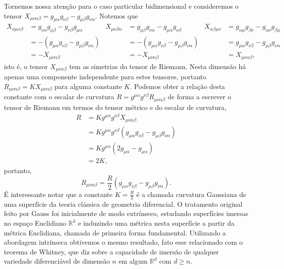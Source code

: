 Tornemos nossa atenção para o caso particular bidimensional e consideremos o tensor \(X_{\mu\nu\alpha\beta} = g_{\mu\alpha} g_{\nu\beta} - g_{\mu\beta}g_{\nu\alpha}\). Notemos que
\begin{align*}
    X_{\nu\mu\alpha\beta} &= g_{\nu\alpha} g_{\mu\beta} - g_{\nu\beta}g_{\mu\alpha} &
    X_{\mu\nu\beta\alpha} &= g_{\mu\beta} g_{\nu\alpha} - g_{\mu\alpha}g_{\nu\beta} &
    X_{\alpha\beta\mu\nu} &= g_{\alpha\mu} g_{\beta\nu} - g_{\alpha\nu}g_{\beta\mu}\\
                          &= -(g_{\mu\alpha} g_{\nu\beta} - g_{\mu\beta}g_{\nu\alpha})&
                          &= -(g_{\mu\alpha} g_{\nu\beta} - g_{\mu\beta}g_{\nu\alpha})&
                          &= g_{\mu\alpha} g_{\nu\beta} - g_{\mu\beta}g_{\nu\alpha}\\
                          &= -X_{\mu\nu\alpha\beta}&
                          &= -X_{\mu\nu\alpha\beta}&
                          &= X_{\mu\nu\alpha\beta},
\end{align*}
isto é, o tensor \(X_{\mu\nu\alpha\beta}\) tem as simetrias do tensor de Riemann. Nesta dimensão há apenas uma componente independente para estes tensores, portanto \(R_{\mu\nu\alpha\beta} = KX_{\mu\nu\alpha\beta}\) para alguma constante \(K\). Podemos obter a relação desta constante com o escalar de curvatura \(R = g^{\mu\alpha}g^{\nu\beta}R_{\mu\nu\alpha\beta}\) de forma a escrever o tensor de Riemann em termos do tensor métrico e do escalar de curvatura,
\begin{align*}
    R &= K g^{\mu\alpha}g^{\nu\beta} X_{\mu\nu\alpha\beta}\\
      &= K g^{\mu\alpha}g^{\nu\beta} \left(g_{\mu\alpha} g_{\nu\beta} - g_{\mu\beta}g_{\nu\alpha}\right)\\
      &= K g^{\mu\alpha} \left(2g_{\mu\alpha} - g_{\mu\alpha}\right)\\
      &= 2K,
\end{align*}
portanto,
\begin{equation*}
    R_{\mu\nu\alpha\beta} = \frac{R}{2} \left(g_{\mu\alpha} g_{\nu\beta} - g_{\mu\beta}g_{\nu\alpha}\right).
\end{equation*}
É interessante notar que a constante \(K = \frac{R}{2}\) é a chamada curvatura Gaussiana de uma superfície da teoria clássica de geometria diferencial. O tratamento original feito por Gauss foi inicialmente de modo extrínseco, estudando superfícies imersas no espaço Euclidiano \(\mathbb{R}^3\) e induzindo uma métrica nesta superfície a partir da métrica Euclidiana, chamada de primeira forma fundamental. Utilizando a abordagem intrínseca obtivemos o mesmo resultado, fato esse relacionado com o teorema de Whitney, que diz sobre a capacidade de imersão de qualquer variedade diferenciável de dimensão \(n\) em algum \(\mathbb{R}^d\) com \(d \geq n\).
